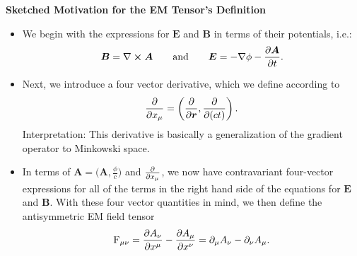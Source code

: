 \documentclass[11pt, a4paper]{article}
\newcommand{\eqtext}[1]{\qquad \text{#1} \qquad}
\renewcommand{\vec}[1]{\bm{#1}} %
\renewcommand{\r}{\vec{r}}
\newcommand{\E}{\vec{E}} %
\newcommand{\B}{\vec{B}} %
\newcommand{\A}{\vec{A}} %
\renewcommand{\curl}{\nabla \cross}
\renewcommand{\grad}{\nabla}
\begin{document}
\textbf{Sketched Motivation for the EM Tensor's Definition}
\begin{itemize}
	\item We begin with the expressions for $ \E $ and $ \B $ in terms of their potentials, i.e.:
	\begin{equation*}
		\B = \curl \A \eqtext{and} \E = - \grad \phi - \pdv{\A}{t}.
	\end{equation*}
    
    \item Next, we introduce a four vector derivative, which we define according to
	\begin{equation*}
		\pdv{x_{\mu}} = \left(\pdv{\r}, \pdv{(ct)} \right).
	\end{equation*}
    Interpretation: This derivative is basically a generalization of the gradient operator to Minkowski space.
    
    \item In terms of $ \A = \big( \A, \tfrac{\phi}{c} \big) $ and $ \pdv{x_{\mu}} $, we now have contravariant four-vector expressions for all of the terms in the right hand side of the equations for $ \E $ and $ \B $. With these four vector quantities in mind, we then define the antisymmetric EM field tensor
	\begin{equation*}
        \operatorname{F}_{\mu \nu} = \pdv{A_{\nu}}{x^{\mu}} - \pdv{A_{\mu}}{x^{\nu}} = \partial_{\mu}A_{\nu} - \partial_{\nu}A_{\mu}.
	\end{equation*}
	
	
	
\end{itemize}

    
\end{document}

